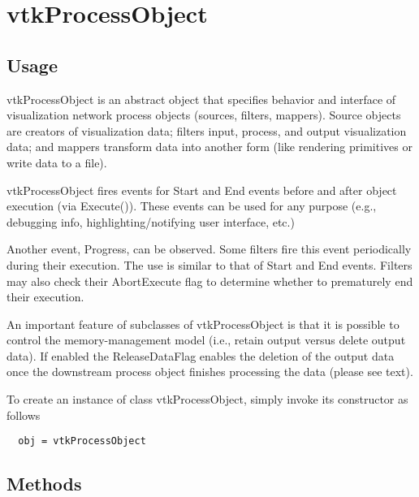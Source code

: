 \section{vtkProcessObject}

\subsection{Usage}

 vtkProcessObject is an abstract object that specifies behavior and
 interface of visualization network process objects (sources, filters,
 mappers). Source objects are creators of visualization data; filters
 input, process, and output visualization data; and mappers transform data
 into another form (like rendering primitives or write data to a file).

 vtkProcessObject fires events for Start and End events before and after
 object execution (via Execute()). These events can be used for any purpose
 (e.g., debugging info, highlighting/notifying user interface, etc.)

 Another event, Progress, can be observed. Some filters fire this 
 event periodically during their execution. The use is similar to that of 
 Start and End events. Filters may also check their AbortExecute
 flag to determine whether to prematurely end their execution.

 An important feature of subclasses of vtkProcessObject is that it is
 possible to control the memory-management model (i.e., retain output
 versus delete output data). If enabled the ReleaseDataFlag enables the
 deletion of the output data once the downstream process object finishes
 processing the data (please see text).  


To create an instance of class vtkProcessObject, simply
invoke its constructor as follows
\begin{verbatim}
  obj = vtkProcessObject
\end{verbatim}
\subsection{Methods}

